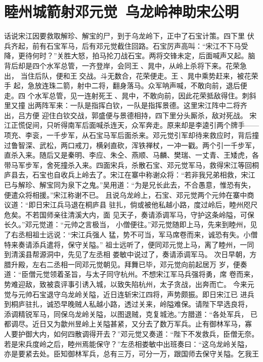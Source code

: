 \chapter{睦州城箭射邓元觉~乌龙岭神助宋公明}

话说宋江因要救取解珍、解宝的尸，到于乌龙岭下，正中了石宝计策。四下里
伏兵齐起，前有石宝军马，后有邓元觉截住回路。石宝厉声高叫：“宋江不下马受
降，更待何时？”关胜大怒，拍马抡刀战石宝。两将交锋未定，后面喊声又起。脑
背后却是四个水军总管，一齐登岸，会同王、晁中，从岭上杀将下来。花荣急出，
当住后队，便和王交战。斗无数合，花荣便走。王、晁中乘势赶来，被花荣手
起，急放连珠二箭，射中二将，翻身落马。众军呐声喊，不敢向前，退后便走。四
个水军总管，见一连射死王、晁中，不敢向前，因此花荣抵敌得住。刺斜里又撞
出两阵军来：一队是指挥白钦，一队是指挥景德。这里宋江阵中二将齐出，吕方便
迎住白钦交战，郭盛便与景德相持，四下里分头厮杀，敌对死战。
宋江正慌促间，只听得南军后面喊杀连天，众军奔走。原来却是李逵引两个牌手——
项充、李衮，一千步军，从石宝马军后面杀来。邓元觉引军却待来救应时，背后撞
过鲁智深、武松，两口戒刀，横剁直砍，浑铁禅杖，一冲一戳。两个引一千步军，
直杀入来。随后又是秦明、李应、朱仝、燕顺、马麟、樊瑞、一丈青、王矮虎，各
带马军步军，舍死撞杀入来。四面宋兵，杀散石宝、邓元觉军马，救得宋江等回桐
庐县去，石宝也自收兵上岭去了。宋江在寨中称谢众将：“若非我兄弟相救，宋江
已与解珍、解宝同为泉下之鬼。”吴用道：“为是兄长此去，不合愚意，惟恐有失，
便遣众将相援。”宋江称谢不已。
且说乌龙岭上，石宝、邓元觉两个元帅在寨中商议道：“即日宋江兵马退在桐庐县
驻扎，倘或被他私越小路，度过岭后，睦州咫尺危矣。不若国师亲往清溪大内，面
见天子，奏请添调军马，守护这条岭隘，可保长久。”邓元觉道：“元帅之言极当，
小僧便往。”邓元觉随即上马，先来到睦州，见了右丞相祖士远说：“宋江兵强人
猛，势不可当，军马席卷而来，诚恐有失。小僧特来奏请添兵遣将，保守关隘。”
祖士远听了，便同邓元觉上马，离了睦州，一同到清溪县帮源洞中，先见了左丞相
娄敏中说过了，奏请添调军马。
次日早朝，方腊升殿，左右二丞相一同邓元觉朝见。拜舞已毕，邓元觉向前起居万
岁，便奏道：“臣僧元觉领着圣旨，与太子同守杭州。不想宋江军马兵强将勇，席
卷而来，势难迎敌，致被袁评事引诱入城，以致失陷杭州，太子贪战，出奔而亡。
今来元觉与元帅石宝退守乌龙岭关隘，近日连斩宋江四将，声势颇振。即日宋江已
进兵到桐庐驻扎，诚恐早晚贼人私越小路，透过关来，岭隘难保。请陛下早选良将，
添调精锐军马，同保乌龙岭关隘，以图退贼，克复城池。”方腊道：“各处军兵，
已都调尽。近日又为歙州昱岭上关隘甚紧，又分去了数万军兵。止有御林军马，寡
人要护御大内，如何四散调得开去？”邓元觉又奏道：“陛下不发救兵，臣僧无奈。
若是宋兵度岭之后，睦州焉能保守？”左丞相娄敏中出班奏曰：“这乌龙岭关隘，
亦是要紧去处。臣知御林军兵，总有三万，可分一万，跟国师去保守关隘。乞我王
